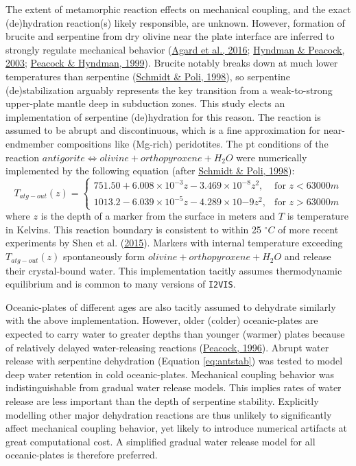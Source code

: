 The extent of metamorphic reaction effects on mechanical coupling, and the exact (de)hydration reaction(s) likely responsible, are unknown. However, formation of brucite and serpentine from dry olivine near the plate interface are inferred to strongly regulate mechanical behavior (\protect\hyperlink{ref-agard2016}{Agard et al., 2016}; \protect\hyperlink{ref-hyndman2003}{Hyndman \& Peacock, 2003}; \protect\hyperlink{ref-peacock1999a}{Peacock \& Hyndman, 1999}). Brucite notably breaks down at much lower temperatures than serpentine (\protect\hyperlink{ref-schmidt1998}{Schmidt \& Poli, 1998}), so serpentine (de)stabilization arguably represents the key transition from a weak-to-strong upper-plate mantle deep in subduction zones. This study elects an implementation of serpentine (de)hydration for this reason. The reaction is assumed to be abrupt and discontinuous, which is a fine approximation for near-endmember compositions like (Mg-rich) peridotites. The \gls{pt} conditions of the reaction \(antigorite \Leftrightarrow olivine + orthopyroxene + H_{2}O\) were numerically implemented by the following equation (after \protect\hyperlink{ref-schmidt1998}{Schmidt \& Poli, 1998}):
\begin{equation}
  T_{atg-out}(z)=
  \begin{cases}
    751.50+6.008\times10^{-3}z-3.469\times10^{-8}z^2,& \text{for } z < 63000m \\
    1013.2-6.039\times10^{-5}z-4.289\times10{-9}z^2,& \text{for } z>63000m
  \end{cases}
  \label{eq:antstab}
\end{equation}
where \(z\) is the depth of a marker from the surface in meters and \(T\) is temperature in Kelvins. This reaction boundary is consistent to within 25 \(^{\circ}C\) of more recent experiments by Shen et al. (\protect\hyperlink{ref-shen2015}{2015}). Markers with internal temperature exceeding \(T_{atg-out}(z)\) spontaneously form \(olivine + orthopyroxene + H_{2}O\) and release their crystal-bound water. This implementation tacitly assumes thermodynamic equilibrium and is common to many versions of \texttt{I2VIS}.

Oceanic-plates of different ages are also tacitly assumed to dehydrate similarly with the above implementation. However, older (colder) oceanic-plates are expected to carry water to greater depths than younger (warmer) plates because of relatively delayed water-releasing reactions (\protect\hyperlink{ref-peacock1996}{Peacock, 1996}). Abrupt water release with serpentine dehydration (Equation \eqref{eq:antstab}) was tested to model deep water retention in cold oceanic-plates. Mechanical coupling behavior was indistinguishable from gradual water release models. This implies rates of water release are less important than the depth of serpentine stability. Explicitly modelling other major dehydration reactions are thus unlikely to significantly affect mechanical coupling behavior, yet likely to introduce numerical artifacts at great computational cost. A simplified gradual water release model for all oceanic-plates is therefore preferred.

